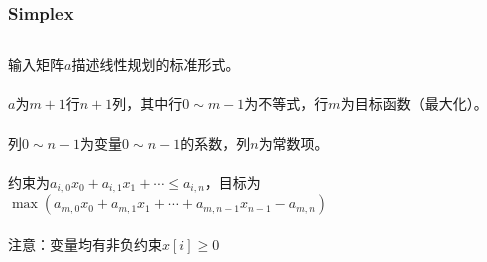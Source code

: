 \documentclass[twoside]{article}
\begin{document}
\subsubsection{Simplex}
\begin{lstlisting}
\end{lstlisting}
输入矩阵$a$描述线性规划的标准形式。\\\\
$a$为$m+1$行$n+1$列，其中行$0 \sim m-1$为不等式，行$m$为目标函数（最大化）。\\\\
列$0 \sim n-1$为变量$0 \sim n-1$的系数，列$n$为常数项。\\\\
约束为$a_{i, 0}x_0 + a_{i, 1}x_1 + \cdots \le a_{i, n}$，目标为$\max(a_{m, 0}x_0 + a_{m, 1}x_1 + \cdots + a_{m, n - 1}x_{n - 1} - a_{m, n})$\\\\
注意：变量均有非负约束$x[i] \ge 0$
\end{document}
